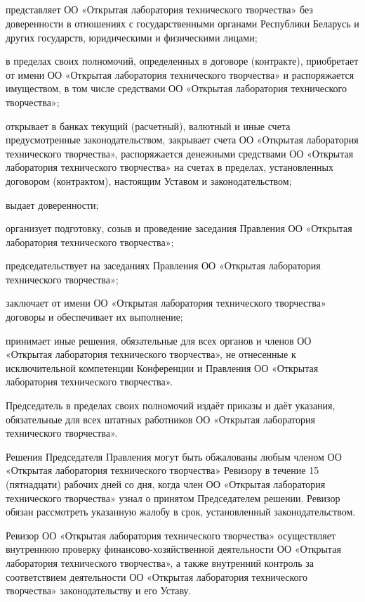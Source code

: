 \documentclass[a4paper,fontsize=14pt,titlepage]{scrartcl}
\makeatletter
\newenvironment{numberedpars}{%
  \addtocounter{secnumdepth}{1}
  \renewcommand\theparagraph{\arabic{section}.\arabic{paragraph}}
  \renewcommand\@seccntformat[1]
  {\expandafter\ifx\csname##1\endcsname\paragraph\csname 
  the##1\endcsname\else\csname the##1\endcsname\quad\fi}
  \let\old@par=\par
  \def\new@par{\let\par=\old@par\paragraph{}\let\par=\new@par}
  \let\par=\new@par
  \par
}{
  \addtocounter{secnumdepth}{-1}
}
\newenvironment{numberedsubpars}{%
  \addtocounter{secnumdepth}{1}
  \renewcommand\thesubparagraph{\arabic{section}.\arabic{paragraph}.\arabic{subparagraph}}
  \renewcommand\@seccntformat[1]
  {\expandafter\ifx\csname##1\endcsname\subparagraph\csname 
  the##1\endcsname\else\csname the##1\endcsname\quad\fi}
  \let\old@@par=\par
  \def\new@@par{\let\par=\old@par\subparagraph{}\let\par=\new@@par}
  \let\par=\new@@par
  \par
}{
  \addtocounter{secnumdepth}{-1}
  \let\par=\old@@par
}
\makeatother
\begin{document}
\begin{numberedpars}
\begin{numberedsubpars}
представляет ОО «Открытая лаборатория технического творчества» без доверенности в отношениях с государственными органами
Республики Беларусь и других государств, юридическими и физическими лицами;

в пределах своих полномочий, определенных в договоре (контракте), приобретает от имени ОО «Открытая лаборатория
технического творчества» и распоряжается имуществом, в том числе средствами ОО «Открытая лаборатория технического
творчества»;

открывает в банках текущий (расчетный), валютный и иные счета предусмотренные законодательством, закрывает счета ОО
«Открытая лаборатория технического творчества», распоряжается денежными средствами ОО «Открытая лаборатория технического
творчества» на счетах в пределах, установленных договором (контрактом), настоящим Уставом и законодательством;

выдает доверенности;

организует подготовку, созыв и проведение заседания Правления ОО «Открытая лаборатория технического творчества»;

председательствует на заседаниях Правления ОО «Открытая лаборатория технического творчества»;

заключает от имени ОО «Открытая лаборатория технического творчества» договоры и обеспечивает их выполнение;

принимает иные решения, обязательные для всех органов и членов ОО «Открытая лаборатория технического творчества», не
отнесенные к исключительной компетенции Конференции и Правления ОО «Открытая лаборатория технического творчества».
\end{numberedsubpars}

Председатель в пределах своих полномочий издаёт приказы и даёт указания, обязательные для всех штатных работников ОО
«Открытая лаборатория технического творчества».

Решения Председателя Правления могут быть обжалованы любым членом ОО «Открытая лаборатория технического творчества»
Ревизору в течение 15 (пятнадцати) рабочих дней со дня, когда член ОО «Открытая лаборатория технического творчества»
узнал о принятом Председателем решении. Ревизор обязан рассмотреть указанную жалобу в срок, установленный
законодательством.

Ревизор ОО «Открытая лаборатория технического творчества» осуществляет внутреннюю проверку финансово-хозяйственной
деятельности ОО «Открытая лаборатория технического творчества», а также внутренний контроль за соответствием
деятельности ОО «Открытая лаборатория технического творчества» законодательству и его Уставу.


\end{numberedpars}
\end{document}
